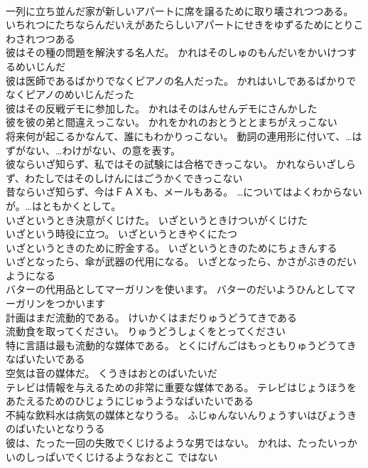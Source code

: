 \documentclass[8pt]{extreport}
\begin{document}
\begin{CJK}{UTF8}{min}
\\	一列に立ち並んだ家が新しいアパートに席を譲るために取り壊されつつある。	いちれつにたちならんだいえがあたらしいアパートにせきをゆずるためにとりこわされつつある 
\\	彼はその種の問題を解決する名人だ。	かれはそのしゅのもんだいをかいけつするめいじんだ 
\\	彼は医師であるばかりでなくピアノの名人だった。	かれはいしであるばかりでなくピアノのめいじんだった 
\\	彼はその反戦デモに参加した。	かれはそのはんせんデモにさんかした 
\\	彼を彼の弟と間違えっこない。	かれをかれのおとうととまちがえっこない 
\\	将来何が起こるかなんて、誰にもわかりっこない。	動詞の連用形に付いて、…はずがない、…わけがない、の意を表す。
\\	彼ならいざ知らず、私ではその試験には合格できっこない。	かれならいざしらず、わたしではそのしけんにはごうかくできっこない 
\\	昔ならいざ知らず、今はＦＡＸも、メールもある。	…についてはよくわからないが。…はともかくとして。
\\	いざというとき決意がくじけた。	いざというときけついがくじけた 
\\	いざという時役に立つ。	いざというときやくにたつ 
\\	いざというときのために貯金する。	いざというときのためにちょきんする 
\\	いざとなったら、傘が武器の代用になる。	いざとなったら、かさがぶきのだいようになる 
\\	バターの代用品としてマーガリンを使います。	バターのだいようひんとしてマーガリンをつかいます 
\\	計画はまだ流動的である。	けいかくはまだりゅうどうてきである 
\\	流動食を取ってください。	りゅうどうしょくをとってください 
\\	特に言語は最も流動的な媒体である。	とくにげんごはもっともりゅうどうてきなばいたいである 
\\	空気は音の媒体だ。	くうきはおとのばいたいだ 
\\	テレビは情報を与えるための非常に重要な媒体である。	テレビはじょうほうをあたえるためのひじょうにじゅうようなばいたいである 
\\	不純な飲料水は病気の媒体となりうる。	ふじゅんないんりょうすいはびょうきのばいたいとなりうる 
\\	彼は、たった一回の失敗でくじけるような男ではない。	かれは、たったいっかいのしっぱいでくじけるようなおとこ ではない 

\end{CJK}
\end{document}
